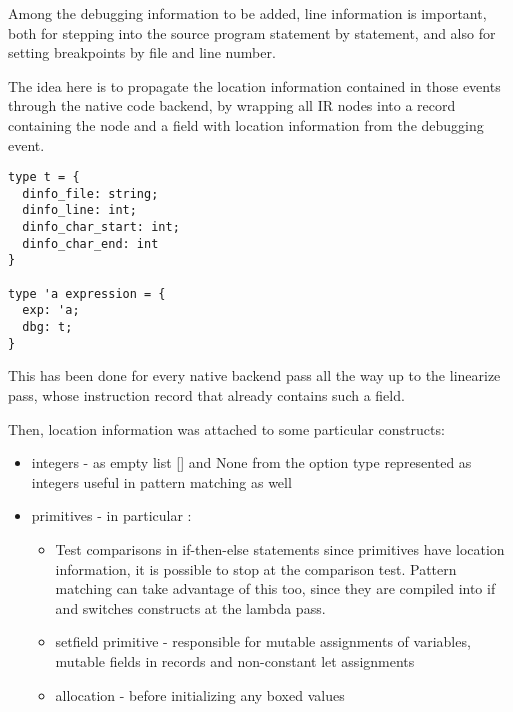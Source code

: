 Among the debugging information to be added, line information is important,
both for stepping into the source program statement by statement,
and also for setting breakpoints by file and line number.

The idea here is to propagate the location information contained in those events
through the native code backend, by wrapping all IR nodes into a record
containing the node and a field with location information from the debugging
event.

\begin{lstlisting}
type t = {
  dinfo_file: string;
  dinfo_line: int;
  dinfo_char_start: int;
  dinfo_char_end: int
}

type 'a expression = {
  exp: 'a;
  dbg: t;
}
\end{lstlisting}

This has been done for every native backend pass all the way up to the linearize
pass, whose instruction record that already contains such a field.

Then, location information was attached to some particular constructs:

\begin{itemize}
    \item integers - as empty list [] and None from the option type represented as integers
        useful in pattern matching as well
    \item primitives - in particular :


        \begin{itemize}
            \item
                Test comparisons in if-then-else statements
                since primitives have location information, it is possible to
                stop at the comparison test.
                Pattern matching can take advantage of this too, since they are compiled into
                if and switches constructs at the lambda pass.
            \item
                setfield primitive - responsible for mutable assignments of variables, mutable
                fields in records and non-constant let assignments
            \item
                allocation - before initializing any boxed values
        \end{itemize}
\end{itemize}

